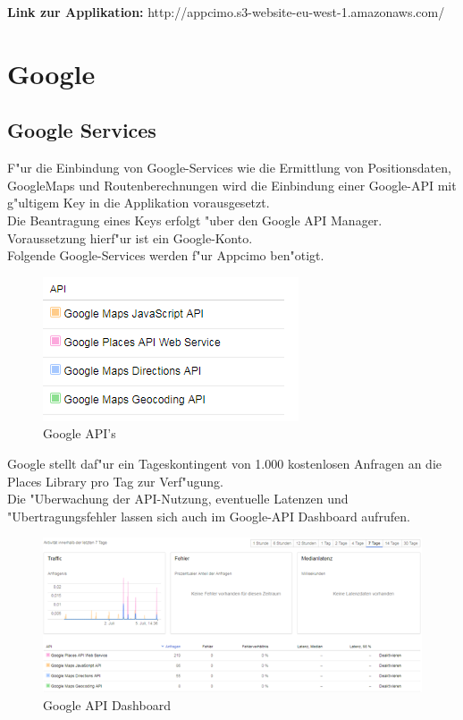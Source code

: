 \documentclass[a4paper, 11pt]{scrreprt}
\begin{document}
\textbf{Link zur Applikation: } http://appcimo.s3-website-eu-west-1.amazonaws.com/ 


\section{Google}

\subsection{Google Services}
F"ur die Einbindung von Google-Services wie die Ermittlung von Positionsdaten, GoogleMaps und Routenberechnungen wird die Einbindung einer Google-API mit g"ultigem Key in die Applikation vorausgesetzt. \\

Die Beantragung eines Keys erfolgt "uber den Google API Manager. Voraussetzung hierf"ur ist ein Google-Konto.\\

Folgende Google-Services werden f"ur Appcimo ben"otigt.

\begin{figure} [H]
\begin{center}
\includegraphics[scale=1]{google1.png}
\caption{Google API's}
\label{googleapi}
\end{center}
\end{figure}

Google stellt daf"ur ein Tageskontingent von 1.000 kostenlosen Anfragen an die Places Library pro Tag zur Verf"ugung.\\
Die "Uberwachung der API-Nutzung, eventuelle Latenzen und "Ubertragungsfehler lassen sich auch im Google-API Dashboard aufrufen.

\begin{figure} [H]
\begin{center}
\includegraphics[scale=1]{google2.png}
\caption{Google API Dashboard}
\label{googledashboard}
\end{center}
\end{figure}
\end{document}
